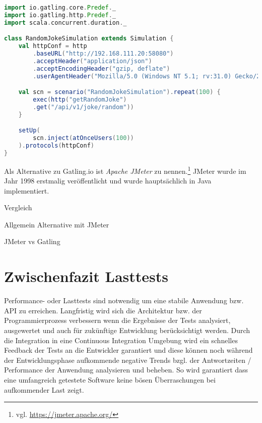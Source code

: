 \begin{minipage}{\linewidth}
\begin{lstlisting}[frame=single,caption=Testabfrage auf Schnittstelle, label=testCodingSample, language=Scala]
import io.gatling.core.Predef._
import io.gatling.http.Predef._
import scala.concurrent.duration._

class RandomJokeSimulation extends Simulation {
    val httpConf = http
        .baseURL("http://192.168.111.20:58080")
        .acceptHeader("application/json")
        .acceptEncodingHeader("gzip, deflate")
        .userAgentHeader("Mozilla/5.0 (Windows NT 5.1; rv:31.0) Gecko/20100101 Firefox/31.0")

    val scn = scenario("RandomJokeSimulation").repeat(100) {
        exec(http("getRandomJoke")
        .get("/api/v1/joke/random"))
    }    

    setUp(
        scn.inject(atOnceUsers(100))
    ).protocols(httpConf)
}
\end{lstlisting}
\end{minipage}

Als Alternative zu Gatling.io ist \textit{Apache JMeter} zu nennen.\footnote{{} vgl. \url{https://jmeter.apache.org/}} JMeter wurde im Jahr 1998 erstmalig veröffentlicht und wurde hauptsächlich in Java implementiert. 

Vergleich \cite{JMetervs63:online}

Allgemein Alternative mit JMeter

JMeter vs Gatling


\section{Zwischenfazit Lasttests}

Performance- oder Lasttests sind notwendig um eine stabile Anwendung bzw. API zu erreichen.
Langfristig wird sich die Architektur bzw. der Programmierprozess verbessern wenn die Ergebnisse der Tests analysiert, ausgewertet und auch für zukünftige Entwicklung berücksichtigt werden. Durch die Integration in eine Continuous  Integration Umgebung wird ein schnelles Feedback der Tests an die Entwickler garantiert und diese können noch während der Entwicklungsphase aufkommende negative Trends bzgl. der Antwortzeiten / Performance der Anwendung analysieren und beheben. So wird garantiert dass eine umfangreich getestete Software keine bösen Überraschungen bei aufkommender Last zeigt.


